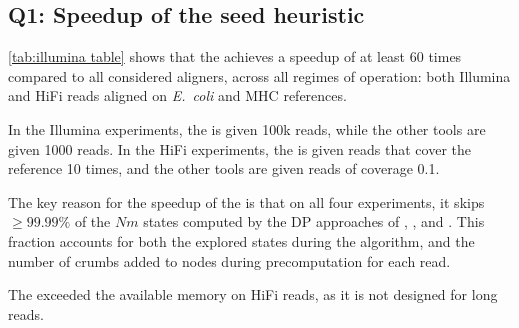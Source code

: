 \subsection{Q1: Speedup of the seed heuristic}
%
\cref{tab:illumina table} shows that the \seedh achieves a speedup of at least
60 times compared to all considered aligners, across all regimes of operation:
both Illumina and HiFi reads aligned on \textit{E.~coli} and MHC references.

In the Illumina experiments, the \seedh is given 100k reads, while the other
tools are given 1000 reads. In the HiFi experiments, the \seedh is given reads
that cover the reference 10 times, and the other tools are given reads of
coverage 0.1.

The key reason for the speedup of the \seedh is that on all four experiments, it
skips $\geq 99.99\%$ of the $Nm$ states computed by the DP approaches of
\graphaligner, \pasgal, and \vargas. This fraction accounts for both the
explored states during the \A algorithm, and the number of crumbs added to nodes
during precomputation for each read.

The \prefixh exceeded the available memory on HiFi reads, as it is not designed
for long reads.
